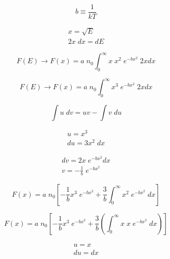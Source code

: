 \documentclass[11pt,a4paper]{article}
\begin{document}
\begin{equation*}
    b \equiv \frac{1}{kT}
\end{equation*}

\begin{equation*}
    \begin{gathered}
        x  = \sqrt{E}\\
        2x \; dx = dE
    \end{gathered}
\end{equation*}

\begin{equation}
    F(E) \rightarrow F(x) = a \; n_0 \int_0^\infty x \; x^2 \; e^{-bx^2} \; 2xdx
\end{equation}

\begin{equation}
    F(E) \rightarrow F(x) = a \; n_0 \int_0^\infty x^3 \; e^{-bx^2} \; 2xdx
\end{equation}

\begin{equation*}
    \int u \; dv = uv - \int v \; du
\end{equation*}

\begin{equation*}
    \begin{gathered}
        u = x^3\\
        du = 3x^2 \; dx
    \end{gathered}
\end{equation*}

\begin{equation*}
    \begin{gathered}
        dv = 2x \; e^{-bx^2} dx\\
        v = -\frac{1}{b} \; e^{-bx^2}
    \end{gathered}
\end{equation*}

\begin{equation}
    F(x) = a \; n_0 [-\frac{1}{b} x^3 \; e^{-bx^2} + \frac{3}{b} \int_0^{\infty} x^2 \; e^{-bx^2} \; dx]
\end{equation}

\begin{equation}
    F(x) = a \; n_0 [-\frac{1}{b} x^3 \; e^{-bx^2} + \frac{3}{b} (\int_0^{\infty} x \; x \; e^{-bx^2} \; dx)]
\end{equation}

\begin{equation*}
    \begin{gathered}
        u = x\\
        du = dx
    \end{gathered}
\end{equation*}
\end{document}
